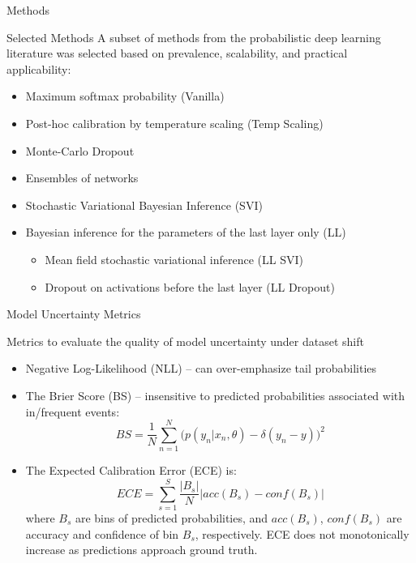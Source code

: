 \documentclass{beamer}
\begin{document}
\begin{frame}{Methods}
    \begin{block}{Selected Methods}
    A subset of methods from the probabilistic deep learning literature was selected based on prevalence, scalability, and practical applicability:
    \begin{itemize}
        \item Maximum softmax probability (Vanilla)
        \item Post-hoc calibration by temperature scaling (Temp Scaling)
        \item Monte-Carlo Dropout
        \item Ensembles of networks
        \item Stochastic Variational Bayesian Inference (SVI)
        \item Bayesian inference for the parameters of the last layer only (LL)
        \begin{itemize}
            \item Mean field stochastic variational inference (LL SVI)
            \item Dropout on activations before the last layer (LL Dropout)
        \end{itemize}
    \end{itemize}
    \end{block}
\end{frame}

\begin{frame}{Model Uncertainty Metrics}
    \begin{block}{}
    Metrics to evaluate the quality of model uncertainty under dataset shift
    \begin{itemize}
        \item Negative Log-Likelihood (NLL) --
        can over-emphasize tail probabilities
        \item The Brier Score (BS) -- insensitive to
predicted probabilities associated with in/frequent events:
        \begin{equation}
        BS = \frac{1}{N} \sum_{n=1}^{N} \Big( p(y_n|x_n, \theta) - \delta(y_n - y)\Big)^2
        \end{equation}
        
        \item The Expected Calibration Error (ECE) is:
        \begin{equation}
        ECE = \sum_{s=1}^{S} \frac{|B_s|}{N} |acc(B_s) - conf(B_s)|
        \end{equation}
        where \( B_s \) are bins of predicted probabilities, and \( acc(B_s) \), \( conf(B_s) \) are accuracy and confidence of bin \( B_s \), respectively. ECE does not monotonically increase as predictions approach ground truth. 
    \end{itemize}
    \end{block}
\end{frame}
\end{document}
